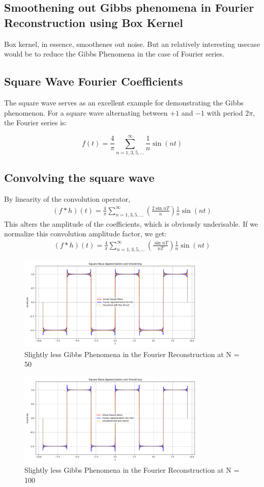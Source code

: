 \subsection{Smoothening out Gibbs phenomena in Fourier Reconstruction using Box Kernel}
Box kernel, in essence, smoothenes out noise. But an relatively interesting usecase would be to reduce the Gibbs Phenomena in the case of Fourier series.
\subsection{Square Wave Fourier Coefficients}
The square wave serves as an excellent example for demonstrating the Gibbs phenomenon. For a square wave alternating between $+1$ and $-1$ with period $2\pi$, the Fourier series is:

\begin{equation}
f(t) = \frac{4}{\pi} \sum_{n=1,3,5,...}^{\infty} \frac{1}{n} \sin(nt)
\end{equation}

\subsection{Convolving the square wave}

By linearity of the convolution operator,
\begin{align}
    (f * h)(t) = \frac{4}{\pi} \sum_{n=1,3,5,...}^{\infty} \left(\frac{2\sin{nT}}{n}\right) \frac{1}{n} \sin(nt) 
\end{align}
This alters the amplitude of the coefficients, which is obviously underisable. If we normalize this convolution amplitude factor, we get:
\begin{align}
    (f * h)(t) = \frac{4}{\pi} \sum_{n=1,3,5,...}^{\infty} \left(\frac{\sin{nT}}{nT}\right) \frac{1}{n} \sin(nt) 
\end{align}


\begin{figure}[!ht]
\centering
\includegraphics[width=0.8\textwidth]{codes/codes_sin_3_and_smoothening/figs/fourier_box_N50.png}
\caption{Slightly less Gibbs Phenomena in the Fourier Reconstruction at N = 50}
\end{figure}
\FloatBarrier

\begin{figure}[!ht]
\centering
\includegraphics[width=0.8\textwidth]{codes/codes_sin_3_and_smoothening/figs/fourier_box_N100.png}
\caption{Slightly less Gibbs Phenomena in the Fourier Reconstruction at N = 100}
\end{figure}
\FloatBarrier
